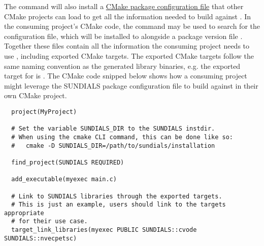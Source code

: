 The  command will also install a
\href{https://cmake.org/cmake/help/v3.12/manual/cmake-packages.7.html\#package-configuration-file}
{CMake package configuration file} that other CMake projects can load to get all
the information needed to build against {\sundials}. In the consuming project's
CMake code, the  command may be used to search for the
configuration file, which will be installed to
alongside a package version file
.
Together these files contain all the information the consuming project needs to
use {\sundials}, including exported CMake targets. The {\sundials} exported
CMake targets follow the same naming convention as the generated library
binaries, e.g. the exported target for {\cvode} is . The
CMake code snipped below shows how a consuming project might leverage the
SUNDIALS package configuration file to build against {\sundials} in their own
CMake project.
\begin{verbatim}
  project(MyProject)

  # Set the variable SUNDIALS_DIR to the SUNDIALS instdir.
  # When using the cmake CLI command, this can be done like so:
  #   cmake -D SUNDIALS_DIR=/path/to/sundials/installation

  find_project(SUNDIALS REQUIRED)

  add_executable(myexec main.c)

  # Link to SUNDIALS libraries through the exported targets.
  # This is just an example, users should link to the targets appropriate
  # for their use case.
  target_link_libraries(myexec PUBLIC SUNDIALS::cvode SUNDIALS::nvecpetsc)
\end{verbatim}



\newlength{\colLenOne}
\settowidth{\colLenOne}{{\sunnonlinsolfixedpoint}}

\newlength{\colLenTwo}
\settowidth{\colLenTwo}{Header files}

\newlength{\colLenThree}
\setlength{\colLenThree}{\textwidth}
\addtolength{\colLenThree}{-0.5in}
\addtolength{\colLenThree}{-\colLenOne}
\addtolength{\colLenThree}{-\colLenTwo}



